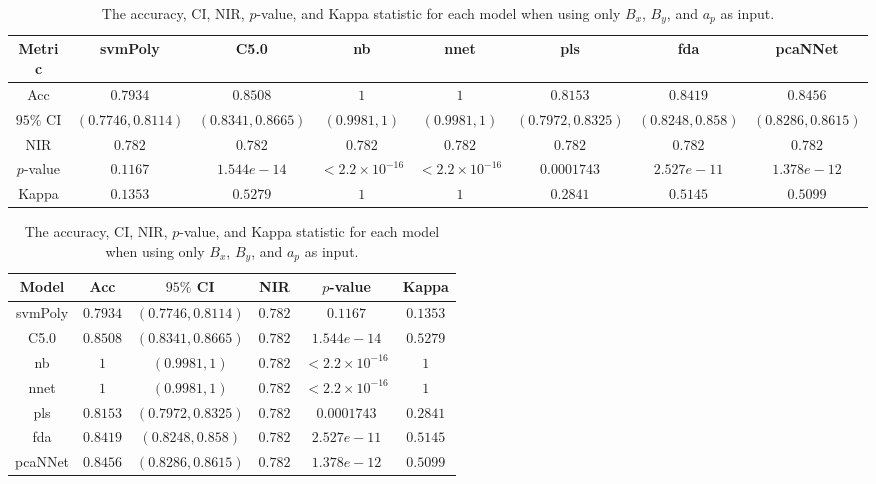 \begin{table}[!ht]
	\centering
	\begin{tabular}{|c|c|c|c|c|c|c|c|}
		\hline
		Metric & svmPoly & C5.0 & nb & nnet & pls & fda & pcaNNet \\ \hline
		Acc & $0.7934$ & $0.8508$ & $1$ & $1$ & $0.8153$ & $0.8419$ & $0.8456$ \\ \hline
		$95\%$ CI & $(0.7746, 0.8114)$ & $(0.8341, 0.8665)$ & $(0.9981, 1)$ & $(0.9981, 1)$ & $(0.7972, 0.8325)$ & $(0.8248, 0.858)$ & $(0.8286, 0.8615)$ \\ \hline
		NIR & $0.782$ & $0.782$ & $0.782$ & $0.782$ & $0.782$ & $0.782$ & $0.782$ \\ \hline
		$p$-value & $0.1167$ & $1.544e-14$ & $< 2.2 \times {10}^{-16}$ & $< 2.2 \times {10}^{-16}$ & $0.0001743$ & $2.527e-11$ & $1.378e-12$ \\ \hline
		Kappa & $0.1353$ & $0.5279$ & $1$ & $1$ & $0.2841$ & $0.5145$ & $0.5099$ \\ \hline
	\end{tabular}
	\caption{The accuracy, CI, NIR, $p$-value, and Kappa statistic for each model when using only $B_{x}$, $B_{y}$, and $a_{p}$ as input.}
	\label{tab:stats:xyap}
\end{table}

\begin{table}[!ht]
	\centering
	\begin{tabular}{|c|c|c|c|c|c|}
		\hline
		Model & Acc & $95\%$ CI & NIR & $p$-value & Kappa \\ \hline
		svmPoly & $0.7934$ & $(0.7746, 0.8114)$ & $0.782$ & $0.1167$ & $0.1353$ \\ \hline
		C5.0 & $0.8508$ & $(0.8341, 0.8665)$ & $0.782$ & $1.544e-14$ & $0.5279$ \\ \hline
		nb & $1$ & $(0.9981, 1)$ & $0.782$ & $< 2.2 \times {10}^{-16}$ & $1$ \\ \hline
		nnet & $1$ & $(0.9981, 1)$ & $0.782$ & $< 2.2 \times {10}^{-16}$ & $1$ \\ \hline
		pls & $0.8153$ & $(0.7972, 0.8325)$ & $0.782$ & $0.0001743$ & $0.2841$ \\ \hline
		fda & $0.8419$ & $(0.8248, 0.858)$ & $0.782$ & $2.527e-11$ & $0.5145$ \\ \hline
		pcaNNet & $0.8456$ & $(0.8286, 0.8615)$ & $0.782$ & $1.378e-12$ & $0.5099$ \\ \hline
	\end{tabular}
	\caption{The accuracy, CI, NIR, $p$-value, and Kappa statistic for each model when using only $B_{x}$, $B_{y}$, and $a_{p}$ as input.}
	\label{tab:stats:reverse:xyap}
\end{table}

